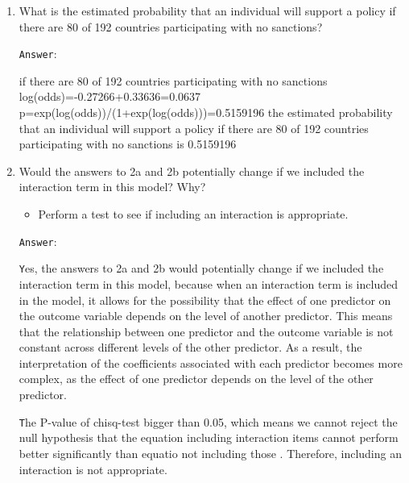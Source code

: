 \documentclass[12pt,letterpaper]{article}
\begin{document}
\begin{enumerate}
\begin{enumerate}
\vspace{3cm}
\
		\item
		What is the estimated probability that an individual will support a policy if there are 80 of 192 countries participating with no sanctions? 
		
			\vspace{4cm}
		
		\texttt{Answer}:
		
		\vspace{.5cm}
		
		if there are 80 of 192 countries participating with no sanctions log(odds)=-0.27266+0.33636=0.0637  p=exp(log(odds))/(1+exp(log(odds)))=0.5159196 the estimated probability that an individual will support a policy if there are 80 of 192 countries participating with no sanctions is 0.5159196
		
			\vspace{3cm}
		
		\item
		Would the answers to 2a and 2b potentially change if we included the interaction term in this model? Why? 
		\begin{itemize}
			\item Perform a test to see if including an interaction is appropriate.
		\end{itemize}
		
		\vspace{3cm}
	
	\texttt{Answer}:
	
	\vspace{.5cm}
		
		\texttt	Yes, the answers to 2a and 2b would potentially change if we included the interaction term in this model, because when an interaction term is included in the model, it allows for the possibility that the effect of one predictor on the outcome variable depends on the level of another predictor. This means that the relationship between one predictor and the outcome variable is not constant across different levels of the other predictor. As a result, the interpretation of the coefficients associated with each predictor becomes more complex, as the effect of one predictor depends on the level of the other predictor.


	
	\texttt  The P-value of chisq-test bigger than 0.05, which means we cannot reject the null hypothesis  that the equation including interaction items cannot perform better significantly than equatio not including those . Therefore, including an interaction is not appropriate.
	

\end{enumerate}
\end{enumerate}
\end{document}
